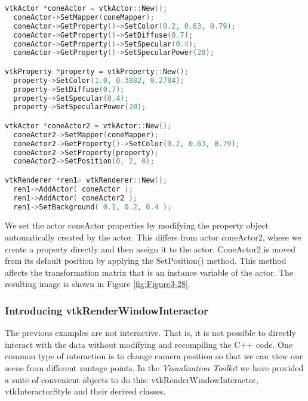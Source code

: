 \begin{lstlisting}[language=C++, caption={Cone4.cxx}]
vtkActor *coneActor = vtkActor::New();
  coneActor->SetMapper(coneMapper);
  coneActor->GetProperty()->SetColor(0.2, 0.63, 0.79);
  coneActor->GetProperty()->SetDiffuse(0.7);
  coneActor->GetProperty()->SetSpecular(0.4);
  coneActor->GetProperty()->SetSpecularPower(20);

vtkProperty *property = vtkProperty::New();
  property->SetColor(1.0, 0.3882, 0.2784);
  property->SetDiffuse(0.7);
  property->SetSpecular(0.4);
  property->SetSpecularPower(20);

vtkActor *coneActor2 = vtkActor::New();
  coneActor2->SetMapper(coneMapper);
  coneActor2->GetProperty()->SetColor(0.2, 0.63, 0.79);
  coneActor2->SetProperty(property);
  coneActor2->SetPosition(0, 2, 0);

vtkRenderer *ren1= vtkRenderer::New();
  ren1->AddActor( coneActor );
  ren1->AddActor( coneActor2 );
  ren1->SetBackground( 0.1, 0.2, 0.4 );
\end{lstlisting}

We set the actor coneActor properties by modifying the property object automatically created by the actor. This differs from actor coneActor2, where we create a property directly and then assign it to the actor. ConeActor2 is moved from its default position by applying the SetPosition() method. This method affects the transformation matrix that is an instance variable of the actor. The resulting image is shown in Figure \ref{fig:Figure3-28}.

\subsubsection{Introducing vtkRenderWindowInteractor}
\label{subsec:introducing_vtkRenderWindowInteractor}

The previous examples are not interactive. That is, it is not possible to directly interact with the data without modifying and recompiling the C++ code. One common type of interaction is to change camera position so that we can view our scene from different vantage points. In the \emph{Visualization Toolkit} we have provided a suite of convenient objects to do this: vtkRenderWindowInteractor, vtkInteractorStyle and their derived classes.


